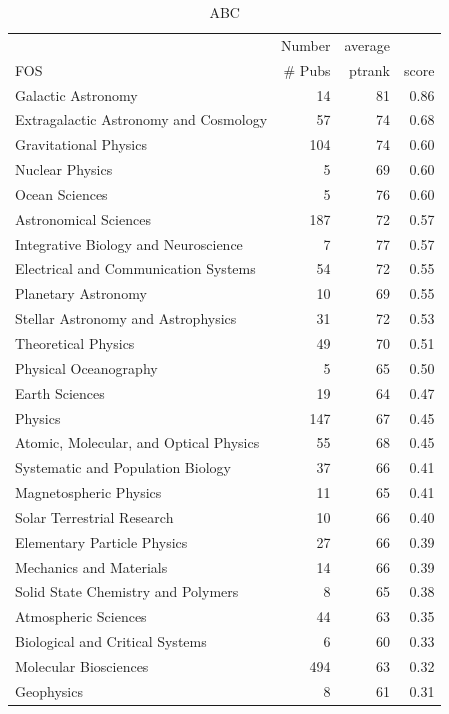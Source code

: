\documentclass{sig-alternate}
\begin{document}
\begin{table}[h]
\begin{tiny}
\caption{ABC}
\label{T:xsede-raw-1}
\begin{tabular}{p{}rrr}
         &  Number &  average &     \\
FOS   &  \# Pubs &  ptrank   &     score \\
\hline
Galactic Astronomy &  14 & 81 &  0.86 \\
Extragalactic Astronomy and Cosmology &  57 &  74 &  0.68 \\
Gravitational Physics &  104 &    74 &  0.60 \\
Nuclear Physics & 5 &   69 &  0.60 \\
Ocean Sciences  & 5 &   76 &  0.60 \\
Astronomical Sciences &  187 &    72 &  0.57 \\
Integrative Biology and Neuroscience &   7 &   77 &  0.57 \\
Electrical and Communication Systems &   54 &  72 &  0.55 \\
Planetary Astronomy &    10 &  69 &  0.55 \\
Stellar Astronomy and Astrophysics &  31 &  72 &  0.53 \\
Theoretical Physics &    49 &  70 &  0.51 \\
Physical Oceanography &  5 &   65 &  0.50 \\
Earth Sciences  & 19 &  64 &  0.47 \\
Physics & 147 &    67 &  0.45 \\
Atomic, Molecular, and Optical Physics  & 55 &  68 &  0.45 \\
Systematic and Population Biology &   37 &  66 &  0.41 \\
Magnetospheric Physics  & 11 &  65 &  0.41 \\
Solar Terrestrial Research &  10 &  66 &  0.40 \\
Elementary Particle Physics &    27 &  66 &  0.39 \\
Mechanics and Materials & 14 &  66 &  0.39 \\
Solid State Chemistry and Polymers &  8 &   65 &  0.38 \\
Atmospheric Sciences &   44 &  63 &  0.35 \\
Biological and Critical Systems & 6 &   60 &  0.33 \\
Molecular Biosciences &  494 &    63 &  0.32 \\
Geophysics &  8 &   61 &  0.31 \\

\end{tabular}
\end{tiny}
\end{table}
\end{document}
